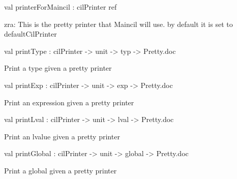 \documentclass[11pt]{article}
\begin{document}
\label{val:Cil.printerForMaincil}\begin{ocamldoccode}
val printerForMaincil : cilPrinter ref
\end{ocamldoccode}
\begin{ocamldocdescription}
zra: This is the pretty printer that Maincil will use.
   by default it is set to defaultCilPrinter


\end{ocamldocdescription}




\label{val:Cil.printType}\begin{ocamldoccode}
val printType : cilPrinter -> unit -> typ -> Pretty.doc
\end{ocamldoccode}
\begin{ocamldocdescription}
Print a type given a pretty printer


\end{ocamldocdescription}




\label{val:Cil.printExp}\begin{ocamldoccode}
val printExp : cilPrinter -> unit -> exp -> Pretty.doc
\end{ocamldoccode}
\begin{ocamldocdescription}
Print an expression given a pretty printer


\end{ocamldocdescription}




\label{val:Cil.printLval}\begin{ocamldoccode}
val printLval : cilPrinter -> unit -> lval -> Pretty.doc
\end{ocamldoccode}
\begin{ocamldocdescription}
Print an lvalue given a pretty printer


\end{ocamldocdescription}




\label{val:Cil.printGlobal}\begin{ocamldoccode}
val printGlobal : cilPrinter -> unit -> global -> Pretty.doc
\end{ocamldoccode}
\begin{ocamldocdescription}
Print a global given a pretty printer


\end{ocamldocdescription}
\end{document}
